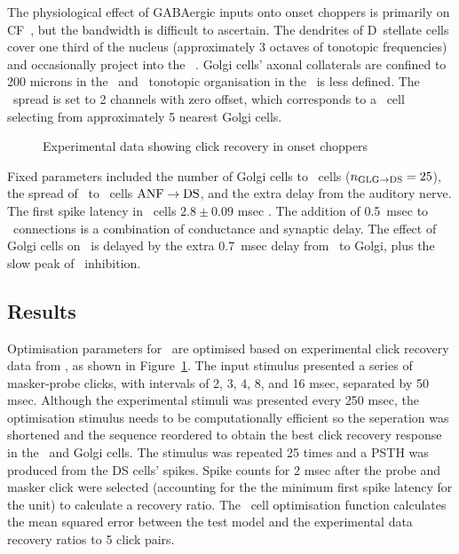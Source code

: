 The physiological effect of GABAergic inputs onto onset choppers is primarily on
CF~\citep{CasparyHaveyEtAl:1979,PalombiCaspary:1992,CasparyBackoffEtAl:1994,CasparyPalombi:1993,CasparyPalombiEtAl:1993},
but the bandwidth is difficult to ascertain.  The dendrites of D~stellate cells
cover one third of the nucleus (approximately 3 octaves of tonotopic
frequencies) and occasionally project into the
\GCD~\citep{ArnottWallaceEtAl:2004}. Golgi cells' axonal collaterals are
confined to 200 microns in the \GCD~and \ANF~tonotopic organisation in the
\GCD~is less defined.  The \GLGDS~spread is set to 2 channels with zero offset,
which corresponds to a \DS~cell selecting from approximately 5 nearest Golgi
cells.

\begin{figure}[htb]
  \centering
  \caption{Experimental data showing click recovery in onset choppers}\label{fig:BackoffPalombi}
\end{figure}

Fixed parameters included 
the number of Golgi cells to \DS~cells ($\protect n_{\protect\textrm{{GLG}}\to\textrm{{DS}}} = 25$), the spread of \ANFs~to
\DS~cells $\protect\textrm{{ANF}}\to\textrm{{DS}}$, and the extra delay from the auditory nerve.  The first
spike latency in \DS~cells $2.8 \pm 0.09$ msec \citep{RhodeSmith:1986}. The addition of
0.5~msec to \ANFDS~connections is a combination of conductance and synaptic
delay. The effect of Golgi cells on \DS~is delayed by the extra 0.7~msec delay
from \ANF~to Golgi, plus the slow peak of \GABAa~inhibition.

\subsection{Results}    \label{sec:DS:results}

Optimisation parameters for \GLGDS~are optimised based on experimental click
recovery data from \citep{BackoffPalombiEtAl:1997}, as shown in
Figure~\ref{fig:BackoffPalombi}. The input stimulus presented a series of
masker-probe clicks, with intervals of 2, 3, 4, 8, and 16 msec, separated by 50 msec. Although the experimental stimuli was presented every 250 msec, the
optimisation stimulus needs to be computationally efficient so the seperation
was shortened and the sequence reordered to obtain the best click recovery
response in the \DS~and Golgi cells.  The stimulus was repeated 25 times and a
PSTH was produced from the DS cells' spikes. Spike counts for 2 msec after the
probe and masker click were selected (accounting for the the minimum first spike
latency for the unit) to calculate a recovery ratio.  The \DS~cell optimisation
function calculates the mean squared error between the test model and the
experimental data recovery ratios to 5 click pairs.


